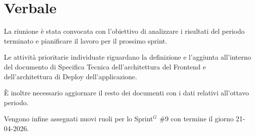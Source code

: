 \documentclass[a4paper,10pt]{article}
\begin{document}
\section*{Verbale}

La riunione è stata convocata con l’obiettivo di analizzare i risultati del periodo terminato e pianificare il lavoro per il prossimo sprint.

Le attività prioritarie individuate riguardano la definizione e l'aggiunta all'interno del documento di Specifica Tecnica dell'architettura del Frontend e dell'architettura di Deploy dell'applicazione. 

È inoltre necessario aggiornare il resto dei documenti con i dati relativi all'ottavo periodo.

Vengono infine assegnati nuovi ruoli per lo Sprint$^G$ \#9 con termine il giorno 21-04-2026.
\end{document}
